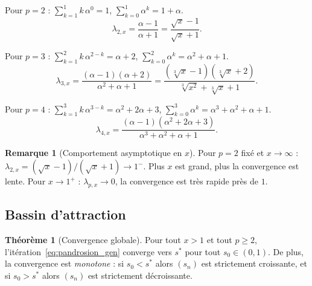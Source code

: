 \documentclass[11pt,a4paper]{article}
\theoremstyle{definition}
\newtheorem{theorem}{Théorème}[section]
\newtheorem{remark}{Remarque}[section]
\newcommand{\cbrt}[1]{\sqrt[3]{#1}}
\begin{document}
Pour $p = 2$ : $\sum_{k=1}^{1} k\,\alpha^{0} = 1$, $\sum_{k=0}^{1}\alpha^k = 1 + \alpha$.
\begin{equation}
  \label{eq:lambda2}
  \lambda_{2,x} = \frac{\alpha - 1}{\alpha + 1} = \frac{\sqrt{x} - 1}{\sqrt{x} + 1}.
\end{equation}

Pour $p = 3$ : $\sum_{k=1}^{2} k\,\alpha^{2-k} = \alpha + 2$, $\sum_{k=0}^{2}\alpha^k = \alpha^2+\alpha+1$.
\begin{equation}
  \label{eq:lambda3}
  \lambda_{3,x} = \frac{(\alpha-1)(\alpha+2)}{\alpha^2 + \alpha + 1} = \frac{(\cbrt{x}-1)(\cbrt{x}+2)}{\cbrt{x^2}+\cbrt{x}+1}.
\end{equation}

Pour $p = 4$ : $\sum_{k=1}^{3}k\,\alpha^{3-k} = \alpha^2 + 2\alpha + 3$, $\sum_{k=0}^{3}\alpha^k = \alpha^3+\alpha^2+\alpha+1$.
\begin{equation}
  \label{eq:lambda4}
  \lambda_{4,x} = \frac{(\alpha-1)(\alpha^2+2\alpha+3)}{\alpha^3+\alpha^2+\alpha+1}.
\end{equation}

\begin{remark}[Comportement asymptotique en $x$]
Pour $p = 2$ fixé et $x \to \infty$ : $\lambda_{2,x} = (\sqrt{x}-1)/(\sqrt{x}+1) \to 1^-$. Plus $x$ est grand, plus la convergence est lente. Pour $x \to 1^+$ : $\lambda_{p,x} \to 0$, la convergence est très rapide près de $1$.
\end{remark}

\subsection{Bassin d'attraction}

\begin{theorem}[Convergence globale]
\label{thm:bassin}
Pour tout $x > 1$ et tout $p \geq 2$, l'itération~\eqref{eq:pandrosion_gen} converge vers $s^*$ pour tout $s_0 \in (0,1)$. De plus, la convergence est \emph{monotone} : si $s_0 < s^*$ alors $(s_n)$ est strictement croissante, et si $s_0 > s^*$ alors $(s_n)$ est strictement décroissante.
\end{theorem}
\end{document}
